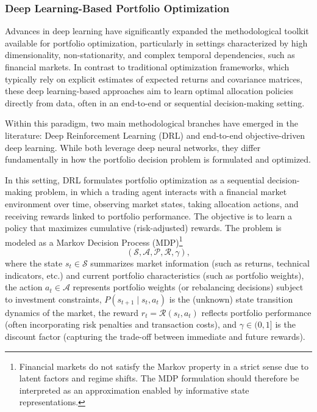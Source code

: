 \subsubsection{Deep Learning-Based Portfolio Optimization}

Advances in deep learning have significantly expanded the methodological toolkit available for portfolio optimization, particularly in settings characterized by high dimensionality, non-stationarity, and complex temporal dependencies, such as financial markets. In contrast to traditional optimization frameworks, which typically rely on explicit estimates of expected returns and covariance matrices, these deep learning-based approaches aim to learn optimal allocation policies directly from data, often in an end-to-end or sequential decision-making setting.

Within this paradigm, two main methodological branches have emerged in the literature: Deep Reinforcement Learning (DRL) and end-to-end objective-driven deep learning. While both leverage deep neural networks, they differ fundamentally in how the portfolio decision problem is formulated and optimized.

In this setting, DRL formulates portfolio optimization as a sequential decision-making problem, in which a trading agent interacts with a financial market environment over time, observing market states, taking allocation actions, and receiving rewards linked to portfolio performance. The objective is to learn a policy that maximizes cumulative (risk-adjusted) rewards. The problem is modeled as a Markov Decision Process (MDP)\footnote{Financial markets do not satisfy the Markov property in a strict sense due to latent factors and regime shifts. The MDP formulation should therefore be interpreted as an approximation enabled by informative state representations.}~\cite{f9c49, d943c}
\[
\left(\mathcal{S}, \mathcal{A}, \mathcal{P}, \mathcal{R}, \gamma\right),
\]
where the state $s_t \in \mathcal{S}$ summarizes market information (such as returns, technical indicators, etc.) and current portfolio characteristics (such as portfolio weights), the action $a_t \in \mathcal{A}$ represents portfolio weights (or rebalancing decisions) subject to investment constraints, $P(s_{t+1} \mid s_t, a_t)$ is the (unknown) state transition dynamics of the market, the reward $r_t = \mathcal{R}(s_t, a_t)$ reflects portfolio performance (often incorporating risk penalties and transaction costs), and $\gamma \in (0,1]$ is the discount factor (capturing the trade-off between immediate and future rewards).

